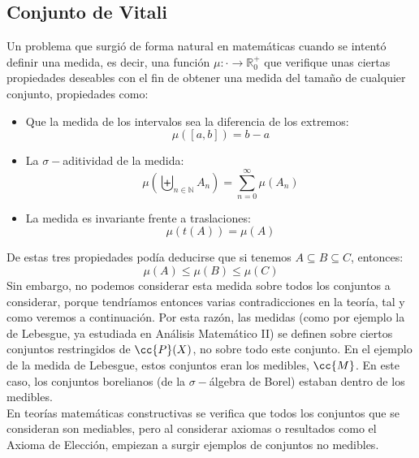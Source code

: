 \subsection{Conjunto de Vitali}
Un problema que surgió de forma natural en matemáticas cuando se intentó definir una medida, es decir, una función $\mu:\cdot \to \mathbb{R}^+_0$ que verifique unas ciertas propiedades deseables con el fin de obtener una medida del tamaño de cualquier conjunto, propiedades como: 
\begin{itemize}
    \item Que la medida de los intervalos sea la diferencia de los extremos:
        \begin{equation*}
            \mu([a,b]) = b-a
        \end{equation*}
    \item La $\sigma-$aditividad de la medida:
        \begin{equation*}
            \mu\left(\biguplus_{n\in \mathbb{N}}A_n\right) = \sum_{n=0}^{\infty} \mu(A_n)
        \end{equation*}
    \item La medida es invariante frente a traslaciones:
        \begin{equation*}
            \mu(t(A)) = \mu(A)
        \end{equation*}
\end{itemize}
De estas tres propiedades podía deducirse que si tenemos $A\subseteq B\subseteq C$, entonces:
\begin{equation*}
    \mu(A) \leq \mu(B) \leq \mu(C)
\end{equation*}
Sin embargo, no podemos considerar esta medida sobre todos los conjuntos a considerar, porque tendríamos entonces varias contradicciones en la teoría, tal y como veremos a continuación. Por esta razón, las medidas (como por ejemplo la de Lebesgue, ya estudiada en Análisis Matemático II) se definen sobre ciertos conjuntos restringidos de $\cc{P}(X)$, no sobre todo este conjunto. En el ejemplo de la medida de Lebesgue, estos conjuntos eran los medibles, $\cc{M}$. En este caso, los conjuntos borelianos (de la $\sigma-$álgebra de Borel) estaban dentro de los medibles.\\

En teorías matemáticas constructivas se verifica que todos los conjuntos que se consideran son mediables, pero al considerar axiomas o resultados como el Axioma de Elección, empiezan a surgir ejemplos de conjuntos no medibles.\\


